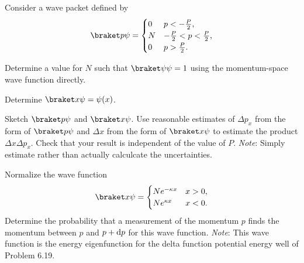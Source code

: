 \documentclass{../phys116}
\begin{document}
\begin{exercise}
  Consider a wave packet defined by
  \[
    \braket p \psi =
    \begin{cases}
      0 & p < -\frac P 2, \\
      N & -\frac P 2 < p < \frac P 2, \\
      0 & p > \frac P 2.
    \end{cases}
  \]
  \begin{problems}
  \item Determine a value for \(N\) such that
    \(\braket \psi \psi = 1\) using the momentum-space wave function
    directly.
  \item Determine \(\braket x \psi = \psi(x)\).
  \item Sketch \(\braket p \psi\) and \(\braket x \psi\).  Use
    reasonable estimates of \(\Delta p_x\) from the form of
    \(\braket p \psi\) and \(\Delta x\) from the form of
    \(\braket x \psi\) to estimate the product
    \(\Delta x \Delta p_x\).  Check that your result is independent of
    the value of \(P\).  \textit{Note}: Simply estimate rather than
    actually calculcate the uncertainties.
  \end{problems}
\end{exercise}

\begin{solution}
  \begin{problems}
  \item
  \item
  \item
  \end{problems}
\end{solution}

\begin{exercise}
  Normalize the wave function
  \[
    \braket x \psi =
    \begin{cases}
      N e^{-\kappa x} & x > 0, \\
      N e^{\kappa x} & x < 0.
    \end{cases}
  \]
  Determine the probability that a measurement of the momentum \(p\)
  finds the momentum between \(p\) and \(p + \mathop{}\!\mathrm d p\) for this wave
  function.  \textit{Note}: This wave function is the energy
  eigenfunction for the delta function potential energy well of
  Problem 6.19.
\end{exercise}

\begin{solution}
\end{solution}
\end{document}
